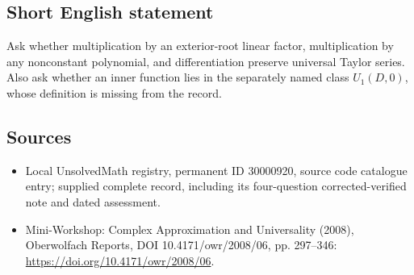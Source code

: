 \documentclass[11pt]{article}
\begin{document}
\subsection{Short English statement}
Ask whether multiplication by an exterior-root linear factor, multiplication by any nonconstant polynomial, and differentiation preserve universal Taylor series. Also ask whether an inner function lies in the separately named class $U_1(D,0)$, whose definition is missing from the record.
\subsection{Sources}
\begin{itemize}
\item Local UnsolvedMath registry, permanent ID 30000920, source code catalogue entry; supplied complete record, including its four-question corrected-verified note and dated assessment.
\item Mini-Workshop: Complex Approximation and Universality (2008), Oberwolfach Reports, DOI 10.4171/owr/2008/06, pp. 297--346: \url{https://doi.org/10.4171/owr/2008/06}.
\end{itemize}
\end{document}
